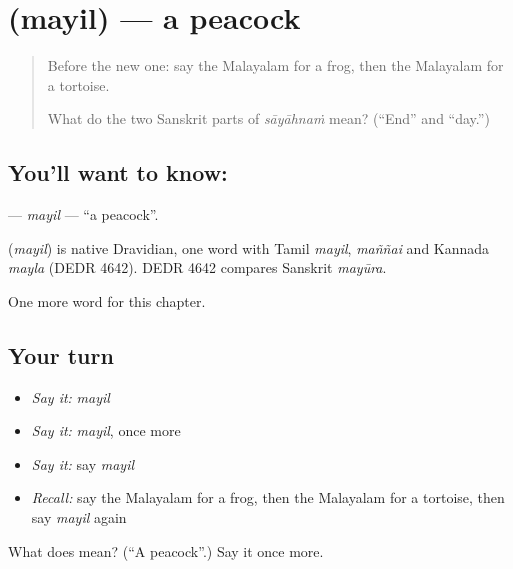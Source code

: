 \section[\texorpdfstring{\ml{മയിൽ} (mayil)}{മയിൽ (mayil)}]{ (mayil) — a peacock}

\label{lesson:ML-C152-mayil}



\begin{quote}
Before the new one: say the Malayalam for a frog, then the Malayalam for a tortoise.

What do the two Sanskrit parts of \emph{sāyāhnaṁ} mean? (\textquotedblleft{}End\textquotedblright{} and \textquotedblleft{}day.\textquotedblright{})
\end{quote}

\subsection*{You'll want to know: }
\textbf{} — \emph{mayil} — \textquotedblleft{}a peacock\textquotedblright{}.

\begin{cousinweb}
\textbf{} (\emph{mayil}) is native Dravidian, one word with Tamil \emph{mayil}, \emph{maññai} and Kannada \emph{mayla} (DEDR 4642). DEDR 4642 compares Sanskrit \emph{mayūra}.
\end{cousinweb}

\begin{grammarlens}[title={What you've built}]
One more word for this chapter.
\end{grammarlens}

\subsection*{Your turn}
\begin{itemize}
\raggedright
  \item \emph{Say it:} \emph{mayil}
  \item \emph{Say it:} \emph{mayil}, once more
  \item \emph{Say it:} say \emph{mayil}
  \item \emph{Recall:} say the Malayalam for a frog, then the Malayalam for a tortoise, then say \emph{mayil} again
\end{itemize}

\begin{tcolorbox}[breakable,colback=teal!4,colframe=teal!35!black,title={Before you move on}]
What does  mean? (\textquotedblleft{}A peacock\textquotedblright{}.) Say it once more.
\end{tcolorbox}
